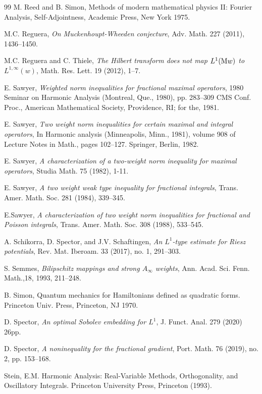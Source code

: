 \documentclass[11pt, a4paper, reqno]{amsart}
\theoremstyle{definition}
\theoremstyle{remark}
\begin{document}
\begin{thebibliography}{99}
 M. Reed and B. Simon, Methods of modern mathematical physics II: Fourier Analysis, Self-Adjointness,
Academic Press, New York 1975.

 M.C. Reguera, \emph{On Muckenhoupt-Wheeden conjecture}, Adv. Math. 227 (2011), 1436--1450.

 M.C. Reguera and C. Thiele, \emph{The Hilbert transform does not map  $L^1(\textup{M}w)$  to $L^{1,\infty}(w)$}, Math. Res. Lett. 19 (2012), 1--7.

 E. Sawyer, \emph{Weighted norm inequalities for fractional maximal operators}, 1980 Seminar on Harmonic Analysis (Montreal, Que., 1980), pp. 283–309
CMS Conf. Proc., American Mathematical Society, Providence, RI; for the, 1981.

 E. Sawyer, \emph{Two weight norm inequalities for certain maximal and integral operators}, In Harmonic analysis (Minneapolis, Minn., 1981), volume 908 of Lecture Notes in Math., pages 102–127. Springer, Berlin, 1982.

 E. Sawyer, \emph{A characterization of a two-weight norm inequality for maximal operators}, Studia Math. 75 (1982), 1-11.


 E. Sawyer, \emph{A two weight weak type inequality for fractional integrals}, Trans. Amer. Math. Soc. 281 (1984), 339--345.

 E.Sawyer, \emph{A characterization of two weight norm inequalities for fractional and Poisson integrals}, Trans. Amer. Math. Soc. 308 (1988), 533--545.


 A. Schikorra, D. Spector, and J.V. Schaftingen, \emph{An $L^1$-type estimate for Riesz potentials}, Rev. Mat. Iberoam. 33 (2017), no. 1, 291--303.

 S. Semmes, \emph{Bilipschitz mappings and strong $A_\infty$ weights}, Ann. Acad. Sci. Fenn. Math.,18, 1993, 211--248.

 B. Simon, {Quantum mechanics for Hamiltonians defined as quadratic forms}. Princeton Univ. Press, Princeton, NJ 1970.


 D. Spector, \emph{An optimal Sobolev embedding for $L^1$}, J. Funct. Anal. 279 (2020) 26pp.

 D. Spector, \emph{A noninequality for the fractional gradient}, Port. Math. 76 (2019), no. 2, pp. 153--168.

 Stein, E.M. Harmonic Analysis: Real-Variable Methods, Orthogonality, and Oscillatory Integrals. Princeton University Press, Princeton (1993).



\end{thebibliography}
\end{document}
